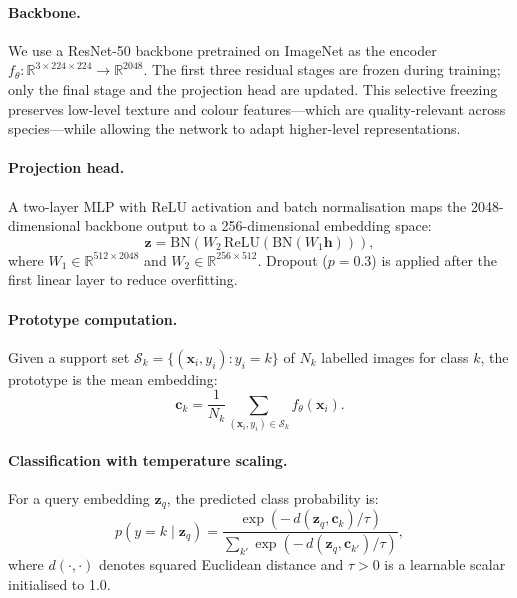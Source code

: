 \documentclass[preprint,12pt,authoryear]{elsarticle}
\begin{document}
\paragraph{Backbone.}
We use a ResNet-50 \citep{he2016deep} backbone pretrained on ImageNet as the encoder
$f_\theta : \mathbb{R}^{3 \times 224 \times 224} \to \mathbb{R}^{2048}$.
The first three residual stages are frozen during training; only the final
stage and the projection head are updated. This selective freezing preserves
low-level texture and colour features---which are quality-relevant across
species---while allowing the network to adapt higher-level representations.

\paragraph{Projection head.}
A two-layer MLP with ReLU activation and batch normalisation maps the 2048-dimensional
backbone output to a 256-dimensional embedding space:
\begin{equation}
  \mathbf{z} = \text{BN}\!\left(W_2 \, \text{ReLU}\!\left(\text{BN}(W_1 \mathbf{h})\right)\right),
\end{equation}
where $W_1 \in \mathbb{R}^{512 \times 2048}$ and $W_2 \in \mathbb{R}^{256 \times 512}$.
Dropout ($p = 0.3$) is applied after the first linear layer to reduce overfitting.

\paragraph{Prototype computation.}
Given a support set $\mathcal{S}_k = \{(\mathbf{x}_i, y_i) : y_i = k\}$
of $N_k$ labelled images for class $k$, the prototype is the mean embedding:
\begin{equation}
  \mathbf{c}_k = \frac{1}{N_k} \sum_{(\mathbf{x}_i, y_i) \in \mathcal{S}_k}
  f_\theta(\mathbf{x}_i).
\end{equation}

\paragraph{Classification with temperature scaling.}
For a query embedding $\mathbf{z}_q$, the predicted class probability is:
\begin{equation}
  p(y = k \mid \mathbf{z}_q) =
  \frac{\exp\!\left(-\,d(\mathbf{z}_q, \mathbf{c}_k) / \tau\right)}
       {\sum_{k'} \exp\!\left(-\,d(\mathbf{z}_q, \mathbf{c}_{k'}) / \tau\right)},
\end{equation}
where $d(\cdot, \cdot)$ denotes squared Euclidean distance and $\tau > 0$ is
a learnable scalar initialised to 1.0.
\end{document}
